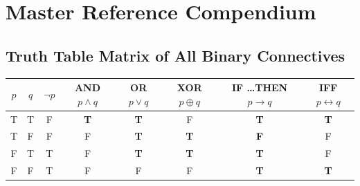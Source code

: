 \documentclass[11pt,a4paper]{article}
\begin{document}
\newpage

\section{Master Reference Compendium}

\subsection{Truth Table Matrix of All Binary Connectives}
\begin{center}
\renewcommand{\arraystretch}{1.2}
\small
\begin{tabular}{|c|c|c|c|c|c|c|c|}
\hline
\rowcolor{navy!15} $p$ & $q$ & $\neg p$ & \shortstack{\textbf{AND}\\$p \wedge q$} & \shortstack{\textbf{OR}\\$p \vee q$} & \shortstack{\textbf{XOR}\\$p \oplus q$} & \shortstack{\textbf{IF \dots THEN}\\$p \rightarrow q$} & \shortstack{\textbf{IFF}\\$p \leftrightarrow q$} \\
\hline
T & T & F & \textbf{T} & \textbf{T} & F & \textbf{T} & \textbf{T} \\
T & F & F & F & \textbf{T} & \textbf{T} & \textbf{F} & F \\
F & T & T & F & \textbf{T} & \textbf{T} & \textbf{T} & F \\
F & F & T & F & F & F & \textbf{T} & \textbf{T} \\
\hline
\end{tabular}
\end{center}
\end{document}
